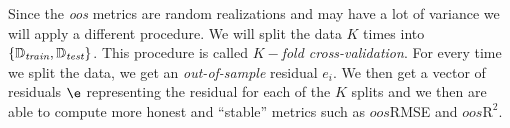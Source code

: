 \documentclass[12pt]{article}
\begin{document}
\begin{enumerate}
\begin{tcolorbox}[colback=white, sharp corners]
\end{tcolorbox}



\begin{tcolorbox}[colback = white, sharp corners]
Since the \emph{oos} metrics are random realizations and may have a lot of variance we will apply a different procedure. We will split the data $K$ times into $\lbrace \mathbb{D}_{\emph{train}}, \mathbb{D}_{\emph{test}} \rbrace$. This procedure is called $K-$\emph{fold cross-validation}. For every time we split the data, we get an \emph{out-of-sample} residual $e_i$. We then get a vector of residuals $\e$ representing the residual for each of the $K$ splits and we then are able to compute more honest and ``stable'' metrics such as $oos$RMSE and $oos\text{R}^2$.

\end{tcolorbox}


\end{enumerate}

\newpage

\end{document}
